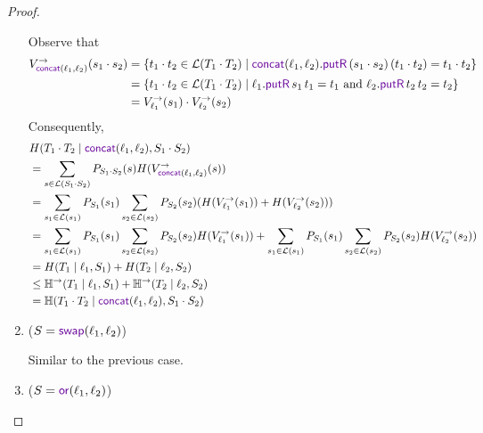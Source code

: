 \documentclass[acmsmall,screen,anonymous]{acmart}
\begin{document}
\begin{proof}
\begin{enumerate}
Observe that 
\begin{align*}
V^{\rightarrow}_{ \ConcatLensOf{\Lens_1}{\Lens_2}}(s_1 \cdot s_2) &= \{t_1 \cdot t_2 \in \mathcal{L}(T_1 \cdot T_2) \; | \;  \ConcatLensOf{\Lens_1}{\Lens_2}.\PutROf{(s_1 \cdot s_2)}{(t_1 \cdot t_2)} = t_1 \cdot t_2\}\\
&= \{t_1 \cdot t_2 \in \mathcal{L}(T_1 \cdot T_2) \; | \;  \ell_1.\PutROf{s_1}{t_1 } = t_1  \text{ and } \ell_2.\PutROf{t_2}{t_2} = t_2\}\\
&= V^{\rightarrow}_{\ell_1}(s_1) \cdot V^{\rightarrow}_{\ell_2}(s_2)
\end{align*}
Consequently,
\begin{align*}
&H(T_1 \cdot T_2 \; | \; \ConcatLensOf{\Lens_1}{\Lens_2}, S_1 \cdot S_2)\\
& =\sum_{s \in \mathcal{L}(S_1 \cdot S_2)}P_{S_1 \cdot S_2}(s) H(V^{\rightarrow}_{\ConcatLensOf{\Lens_1}{\Lens_2}}(s))\\
&= \sum_{s_1 \in \mathcal{L}(s_1)} P_{S_1}(s_1)\sum_{s_2 \in \mathcal{L}(s_2)}P_{S_2}(s_2)(H(V^{\rightarrow}_{\ell_1}(s_1)) + H(V^{\rightarrow}_{\ell_2}(s_2)))\\
&= \sum_{s_1 \in \mathcal{L}(s_1)} P_{S_1}(s_1)\sum_{s_2 \in \mathcal{L}(s_2)}P_{S_2}(s_2)H(V^{\rightarrow}_{\ell_1}(s_1)) + \sum_{s_1 \in \mathcal{L}(s_1)} P_{S_1}(s_1)\sum_{s_2 \in \mathcal{L}(s_2)}P_{S_2}(s_2)H(V^{\rightarrow}_{\ell_2}(s_2))\\
&= H(T_1 \; | \; \ell_1, S_1) + H(T_2 \; | \; \ell_2, S_2)\\
&\leq \mathbb{H}^{\rightarrow}(T_1 \; | \; \ell_1, S_1) + \mathbb{H}^{\rightarrow}(T_2 \; | \; \ell_2, S_2)\\
&= \mathbb{H}(T_1 \cdot T_2 \; | \; \ConcatLensOf{\Lens_1}{\Lens_2}, S_1 \cdot S_2)
\end{align*}
\item
($S = \SwapLensOf{\Lens_1}{\Lens_2}$)

Similar to the previous case.
\item
($S = \OrLensOf{\Lens_1}{\Lens_2}$)


\end{enumerate}
\end{proof}
\end{document}
